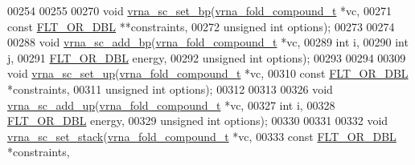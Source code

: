 \begin{DoxyCode}
00254 
00255 
00270 \textcolor{keywordtype}{void} \mbox{\hyperlink{group__soft__constraints_ga8e4334b24bc91453fbcda490a4e331af}{vrna\_sc\_set\_bp}}(\mbox{\hyperlink{group__fold__compound_structvrna__fc__s}{vrna\_fold\_compound\_t}}  *vc,
00271                     \textcolor{keyword}{const} \mbox{\hyperlink{group__data__structures_ga31125aeace516926bf7f251f759b6126}{FLT\_OR\_DBL}}      **constraints,
00272                     \textcolor{keywordtype}{unsigned} \textcolor{keywordtype}{int}          options);
00273 
00274 
00288 \textcolor{keywordtype}{void} \mbox{\hyperlink{group__soft__constraints_gaf162aedac7422f2eb16ea030f47d2f4b}{vrna\_sc\_add\_bp}}(\mbox{\hyperlink{group__fold__compound_structvrna__fc__s}{vrna\_fold\_compound\_t}}  *vc,
00289                     \textcolor{keywordtype}{int}                   i,
00290                     \textcolor{keywordtype}{int}                   j,
00291                     \mbox{\hyperlink{group__data__structures_ga31125aeace516926bf7f251f759b6126}{FLT\_OR\_DBL}}            energy,
00292                     \textcolor{keywordtype}{unsigned} \textcolor{keywordtype}{int}          options);
00293 
00294 
00309 \textcolor{keywordtype}{void} \mbox{\hyperlink{group__soft__constraints_ga99ed63f3ef9e7fe3997932030487a344}{vrna\_sc\_set\_up}}(\mbox{\hyperlink{group__fold__compound_structvrna__fc__s}{vrna\_fold\_compound\_t}}  *vc,
00310                     \textcolor{keyword}{const} \mbox{\hyperlink{group__data__structures_ga31125aeace516926bf7f251f759b6126}{FLT\_OR\_DBL}}      *constraints,
00311                     \textcolor{keywordtype}{unsigned} \textcolor{keywordtype}{int}          options);
00312 
00313 
00326 \textcolor{keywordtype}{void} \mbox{\hyperlink{group__soft__constraints_ga069915fe203a2c8e522dd37847177a09}{vrna\_sc\_add\_up}}(\mbox{\hyperlink{group__fold__compound_structvrna__fc__s}{vrna\_fold\_compound\_t}}  *vc,
00327                     \textcolor{keywordtype}{int}                   i,
00328                     \mbox{\hyperlink{group__data__structures_ga31125aeace516926bf7f251f759b6126}{FLT\_OR\_DBL}}            energy,
00329                     \textcolor{keywordtype}{unsigned} \textcolor{keywordtype}{int}          options);
00330 
00331 
00332 \textcolor{keywordtype}{void} \mbox{\hyperlink{constraints__soft_8h_a8343fa982e5d493cb8519c6dda07e4bf}{vrna\_sc\_set\_stack}}(\mbox{\hyperlink{group__fold__compound_structvrna__fc__s}{vrna\_fold\_compound\_t}} *vc,
00333                        \textcolor{keyword}{const} \mbox{\hyperlink{group__data__structures_ga31125aeace516926bf7f251f759b6126}{FLT\_OR\_DBL}}     *constraints,

\end{DoxyCode}
